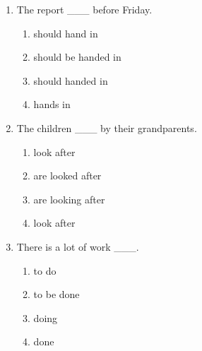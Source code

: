 \documentclass[11pt,a4paper]{ctexart}
\begin{document}
\begin{enumerate}[leftmargin=*,itemsep=4pt]
\begin{enumerate}[label=\Alph*.,leftmargin=2em,itemsep=1pt,topsep=2pt]
\item is repaired
\item repaired
\end{enumerate}
\item The report \_\_\_ before Friday.
\begin{enumerate}[label=\Alph*.,leftmargin=2em,itemsep=1pt,topsep=2pt]
\item should hand in
\item should be handed in
\item should handed in
\item hands in
\end{enumerate}
\item The children \_\_\_ by their grandparents.
\begin{enumerate}[label=\Alph*.,leftmargin=2em,itemsep=1pt,topsep=2pt]
\item look after
\item are looked after
\item are looking after
\item look after
\end{enumerate}
\item There is a lot of work \_\_\_.
\begin{enumerate}[label=\Alph*.,leftmargin=2em,itemsep=1pt,topsep=2pt]
\item to do
\item to be done
\item doing
\item done
\end{enumerate}
\end{enumerate}
\end{document}

